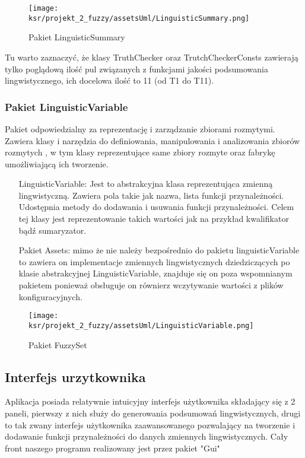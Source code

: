 \documentclass{article}
\begin{document}
\begin{figure}[H]
\centering
\texttt{[image: ksr/projekt\_2\_fuzzy/assetsUml/LinguisticSummary.png]}
\caption{Pakiet LinguisticSummary}
\label{fig:epsilon_bat}
\end{figure}

\noindent Tu warto zaznaczyć, że klasy TruthChecker oraz TrutchCheckerConsts zawierają tylko poglądową ilość pul związanych z funkcjami jakości podsumowania lingwistycznego, ich docelowa ilość to 11 (od T1 do T11).

\subsubsection{Pakiet LinguisticVariable}

\noindent Pakiet odpowiedzialny za reprezentację i zarządzanie zbiorami rozmytymi. Zawiera klasy i narzędzia do definiowania, manipulowania i analizowania zbiorów rozmytych \cite{niewiadomski19}, w tym klasy reprezentujące same zbiory rozmyte oraz fabrykę umożliwiającą ich tworzenie.

\begin{itemize}
    \item[LinguisticVariable:] Jest to abstrakcyjna klasa reprezentująca zmienną lingwistyczną. Zawiera pola takie jak nazwa, lista funkcji przynależności. Udostępnia metody do dodawania i usuwania funkcji przynależności. Celem tej klasy jest reprezentowanie takich wartości jak na przykład kwalifikator bądź sumaryzator.
    \item[Pakiet Assets:] mimo że nie należy bezpośrednio do pakietu linguisticVariable to zawiera on implementacje zmiennych lingwistycznych dziedziczących po klasie abstrakcyjnej LinguisticVariable, znajduje się on poza wspomnianym pakietem ponieważ obsługuje on równierz wczytywanie wartości z plików konfiguracyjnych. 
\end{itemize}

\begin{figure}[H]
\centering
\texttt{[image: ksr/projekt\_2\_fuzzy/assetsUml/LinguisticVariable.png]}
\caption{Pakiet FuzzySet}
\label{fig:epsilon_bat}
\end{figure}

\subsection{Interfejs urzytkownika}

\noindent Aplikacja posiada relatywnie intuicyjny interfejs użytkownika składający się z 2 paneli, pierwszy z nich służy do generowania podsumowań lingwistycznych, drugi to tak zwany interfejs użytkownika zaawansowanego pozwalający na tworzenie i dodawanie funkcji przynależności do danych zmiennych lingwistycznych. Cały front naszego programu realizowany jest przez pakiet "Gui" \\ 
\end{document}
